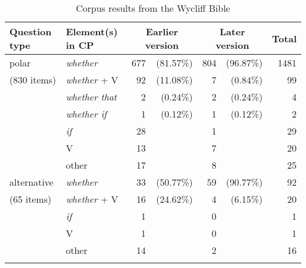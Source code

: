 \begin{table}[H]
\begin{tabular}{l l r@{~}r r@{~}r r}
\lsptoprule
Question type & Element(s) in CP & \multicolumn{2}{c}{Earlier version} & \multicolumn{2}{c}{Later version} & Total\\\midrule
polar       & \textit{whether}      & 677 &  (81.57\%) & 804 & (96.87\%) & 1481\\
(830 items) & \textit{whether} + V  & 92  &  (11.08\%) & 7   & (0.84\%)   & 99\\
{}          & \textit{whether that} & 2   & (0.24\%)   & 2   & (0.24\%)   & 4\\
{}          & \textit{whether if}   & 1   & (0.12\%)   & 1   & (0.12\%)   & 2\\
{}          & \textit{if}           & 28           &            & 1            &         & 29\\
{}          & V                     & 13           &            & 7            &         & 20\\
{}          & other                 & 17           &            & 8            &         & 25\\\midrule
alternative & \textit{whether}      & 33 & (50.77\%) & 59 &  (90.77\%) & 92\\
(65 items)  & \textit{whether} + V  & 16 & (24.62\%) & 4  & (6.15\%)   & 20\\
{}          & \textit{if}           & 1           &           & 0           &            & 1\\
{}          & V                     & 1           &           & 0           &            & 1\\
{}          & other                 & 14          &           & 2           &            & 16\\
\lspbottomrule
\end{tabular}
\caption{Corpus results from the Wycliff Bible\label{tablewycliffpolalt}}
\end{table}

